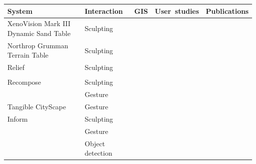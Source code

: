 \documentclass[prodmode,acmtochi]{acmsmall} %
\begin{document}
\begin{table}
{\begin{tabulary}{1.0\textwidth}{LLCLL}
\toprule
System & \mbox{Interaction} & GIS & \mbox{User studies} & Publications\\
\midrule
%
XenoVision Mark III Dynamic Sand Table & Sculpting &&&\\
%
Northrop Grumman Terrain Table & Sculpting &&&\\
%
Relief & Sculpting &&& \cite{Leithinger2009}\\
&&&& \cite{Leithinger2010}\\
%
Recompose & Sculpting &&& \cite{Leithinger2011}\\
& Gesture &&& \cite{Blackshaw2011}\\
%
Tangible CityScape & Gesture &&&\\
% 
Inform & Sculpting &&& \cite{Follmer2013}\\
& Gesture\\
& Object detection\\
%
\bottomrule
\end{tabulary}}
\label{table:shape_changing} 
\end{table}










% 
% 

\end{document}
